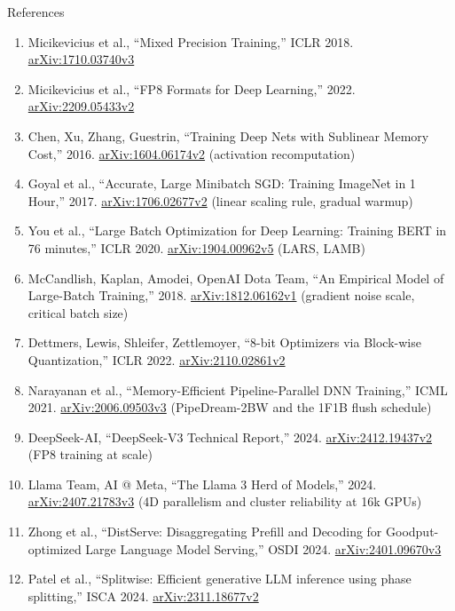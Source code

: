 \begin{frame}[allowframebreaks]{References}
\begin{enumerate}
    \item Micikevicius et al., ``Mixed Precision Training,'' ICLR 2018. \href{https://arxiv.org/abs/1710.03740v3}{arXiv:1710.03740v3}
    \item Micikevicius et al., ``FP8 Formats for Deep Learning,'' 2022. \href{https://arxiv.org/abs/2209.05433v2}{arXiv:2209.05433v2}
    \item Chen, Xu, Zhang, Guestrin, ``Training Deep Nets with Sublinear Memory Cost,'' 2016. \href{https://arxiv.org/abs/1604.06174v2}{arXiv:1604.06174v2} (activation recomputation)
    \item Goyal et al., ``Accurate, Large Minibatch SGD: Training ImageNet in 1 Hour,'' 2017. \href{https://arxiv.org/abs/1706.02677v2}{arXiv:1706.02677v2} (linear scaling rule, gradual warmup)
    \item You et al., ``Large Batch Optimization for Deep Learning: Training BERT in 76 minutes,'' ICLR 2020. \href{https://arxiv.org/abs/1904.00962v5}{arXiv:1904.00962v5} (LARS, LAMB)
    \item McCandlish, Kaplan, Amodei, OpenAI Dota Team, ``An Empirical Model of Large-Batch Training,'' 2018. \href{https://arxiv.org/abs/1812.06162v1}{arXiv:1812.06162v1} (gradient noise scale, critical batch size)
    \item Dettmers, Lewis, Shleifer, Zettlemoyer, ``8-bit Optimizers via Block-wise Quantization,'' ICLR 2022. \href{https://arxiv.org/abs/2110.02861v2}{arXiv:2110.02861v2}
    \item Narayanan et al., ``Memory-Efficient Pipeline-Parallel DNN Training,'' ICML 2021. \href{https://arxiv.org/abs/2006.09503v3}{arXiv:2006.09503v3} (PipeDream-2BW and the 1F1B flush schedule)
    \item DeepSeek-AI, ``DeepSeek-V3 Technical Report,'' 2024. \href{https://arxiv.org/abs/2412.19437v2}{arXiv:2412.19437v2} (FP8 training at scale)
    \item Llama Team, AI @ Meta, ``The Llama 3 Herd of Models,'' 2024. \href{https://arxiv.org/abs/2407.21783v3}{arXiv:2407.21783v3} (4D parallelism and cluster reliability at 16k GPUs)
    \item Zhong et al., ``DistServe: Disaggregating Prefill and Decoding for Goodput-optimized Large Language Model Serving,'' OSDI 2024. \href{https://arxiv.org/abs/2401.09670v3}{arXiv:2401.09670v3}
    \item Patel et al., ``Splitwise: Efficient generative LLM inference using phase splitting,'' ISCA 2024. \href{https://arxiv.org/abs/2311.18677v2}{arXiv:2311.18677v2}

\end{enumerate}
\end{frame}

